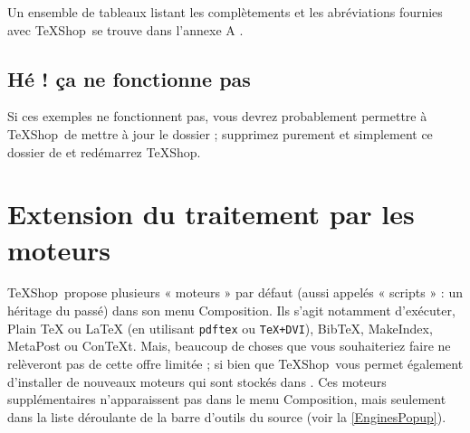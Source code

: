 \documentclass[11pt,french]{article}
\newcommand{\TS}{\textsf{\TeX Shop}}
\newcommand{\mnu}[1]{\textsf{#1}}
\newcommand{\selmark}{\colorbox{cyan}{\rule[-0.5ex]{0ex}{2.1ex}\texttt{•}}}
\begin{document}


Un ensemble de tableaux listant les complètements et les abréviations fournies avec \TS\ se trouve dans l'annexe A  .

\subsection{Hé ! ça ne fonctionne pas}

Si ces exemples ne fonctionnent pas, vous devrez probablement permettre à \TS\ de mettre à jour le dossier  ; supprimez purement et simplement ce dossier de  et redémarrez \TS.



\section{Extension du traitement par les moteurs}

\TS\ propose plusieurs « moteurs » par défaut (aussi appelés « scripts » : un héritage du passé) dans son menu \mnu{Composition}. Ils s'agit notamment d'exécuter, \mnu{Plain TeX} ou \mnu{LaTeX} (en utilisant \texttt{pdftex} ou \texttt{TeX+DVI}), \mnu{BibTeX},  \mnu{MakeIndex}, \mnu{MetaPost} ou \mnu{ConTeXt}. Mais, beaucoup de choses que vous souhaiteriez faire ne relèveront pas de cette offre limitée ; si bien que \TS\ vous permet également d'installer de nouveaux moteurs qui sont stockés dans . Ces moteurs supplémentaires n'apparaissent pas dans le menu \mnu{Composition}, mais seulement dans la liste déroulante de la barre d'outils du source (voir la \vref{EnginesPopup}).
\end{document}
